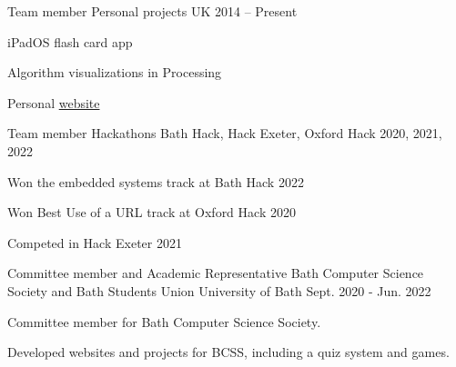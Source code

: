 


\begin{cventries}


\cventry
{Team member} %
{Personal projects} %
{UK} %
{2014 -- Present} %
{ %
\begin{cvitems}
\item {iPadOS flash card app}
\item {Algorithm visualizations in Processing}
\item {Personal \href{https://www.alfierichards.com/}{website}}
\end{cvitems}
}


\cventry
{Team member} %
{Hackathons} %
{Bath Hack, Hack Exeter, Oxford Hack} %
{2020, 2021, 2022} %
{ %
\begin{cvitems}
\item {Won the embedded systems track at Bath Hack 2022}
\item {Won Best Use of a URL track at Oxford Hack 2020}
\item {Competed in Hack Exeter 2021}
\end{cvitems}
}


\cventry
{Committee member and Academic Representative} %
{Bath Computer Science Society and Bath Students Union} %
{University of Bath} %
{Sept. 2020 - Jun. 2022} %
{ %
\begin{cvitems}
\item {Committee member for Bath Computer Science Society.}
\item {Developed websites and projects for BCSS, including a quiz system and games.}
\end{cvitems}
}


\end{cventries}
